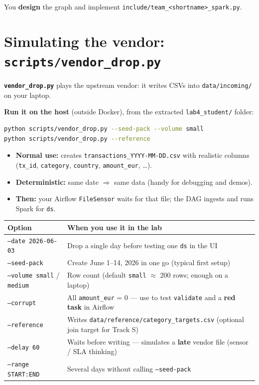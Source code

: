 \documentclass[11pt,a4paper]{article}
\begin{document}
You \textbf{design} the graph and implement \texttt{include/team\_<shortname>\_spark.py}.

\section*{Simulating the vendor: \texttt{scripts/vendor\_drop.py}}
\label{sec:vendor}

\textbf{\texttt{vendor\_drop.py}} plays the upstream vendor: it writes CSVs into \texttt{data/incoming/} on your laptop.

\noindent\textbf{Run it on the host} (outside Docker), from the extracted \texttt{lab4\_student/} folder:

\begin{lstlisting}[language=bash]
python scripts/vendor_drop.py --seed-pack --volume small
python scripts/vendor_drop.py --reference
\end{lstlisting}

\begin{itemize}[nosep]
  \item \textbf{Normal use:} creates \texttt{transactions\_YYYY-MM-DD.csv} with realistic columns
        (\texttt{tx\_id}, \texttt{category}, \texttt{country}, \texttt{amount\_eur}, \ldots).
  \item \textbf{Deterministic:} same date $\Rightarrow$ same data (handy for debugging and demos).
  \item \textbf{Then:} your Airflow \texttt{FileSensor} waits for that file; the DAG ingests and runs Spark for \texttt{ds}.
\end{itemize}

\begin{center}
\small
\renewcommand{\arraystretch}{1.25}
\begin{tabular}{@{} l p{9.2cm} @{}}
\toprule
\textbf{Option} & \textbf{When you use it in the lab} \\
\midrule
\texttt{--date 2026-06-03} & Drop a single day before testing one \texttt{ds} in the UI \\
\texttt{--seed-pack} & Create June 1--14, 2026 in one go (typical first setup) \\
\texttt{--volume small} / \texttt{medium} & Row count (default \texttt{small} $\approx$ 200 rows; enough on a laptop) \\
\texttt{--corrupt} & All \texttt{amount\_eur} = 0 --- use to test \texttt{validate} and a \textbf{red task} in Airflow \\
\texttt{--reference} & Writes \texttt{data/reference/category\_targets.csv} (optional join target for Track S) \\
\texttt{--delay 60} & Waits before writing --- simulates a \textbf{late} vendor file (sensor / SLA thinking) \\
\texttt{--range START:END} & Several days without calling \texttt{--seed-pack} \\
\bottomrule
\end{tabular}
\end{center}
\end{document}
